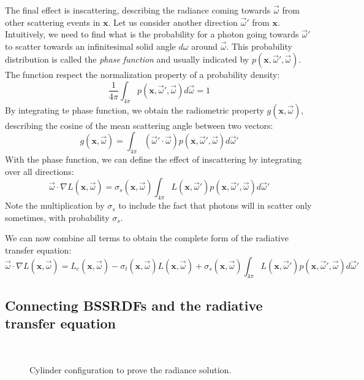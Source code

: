 The final effect is inscattering, describing the radiance coming towards $\vec{\omega}$ from other scattering events in $\mathbf{x}$. Let us consider another direction $\vec{\omega}'$ from $\mathbf{x}$. Intuitively, we need to find what is the probability for a photon going towards $\vec{\omega}'$ to scatter towards an infinitesimal solid angle $d{\omega}$ around $\vec{\omega}$. This probability distribution is called the \emph{phase function} and usually indicated by $p(\mathbf{x}, \vec{\omega}', \vec{\omega})$. The function respect the normalization property of a probability density:
$$\frac{1}{4\pi}\int_{4\pi} p(\mathbf{x}, \vec{\omega}', \vec{\omega}) d\vec{\omega} = 1$$
By integrating te phase function, we obtain the radiometric property $g(\mathbf{x}, \vec{\omega})$, describing the cosine of the mean scattering angle between two vectors:
$$g(\mathbf{x}, \vec{\omega}) = \int_{4\pi} (\vec{\omega}' \cdot \vec{\omega}) p(\mathbf{x}, \vec{\omega}', \vec{\omega}) d\vec{\omega}'$$
With the phase function, we can define the effect of inscattering by integrating over all directions:
$$\vec{\omega} \cdot \nabla L(\mathbf{x}, \vec{\omega}) = \sigma_s(\mathbf{x}, \vec{\omega}) \int_{4\pi} L(\mathbf{x}, \vec{\omega}')  p(\mathbf{x}, \vec{\omega}', \vec{\omega}) d \vec{\omega}'$$
Note the multiplication by $\sigma_s$ to include the fact that photons will in scatter only sometimes, with probability $\sigma_s$. 

We can now combine all terms to obtain the complete form of the radiative transfer equation:
$$\vec{\omega} \cdot \nabla L(\mathbf{x}, \vec{\omega}) = L_e(\mathbf{x}, \vec{\omega}) - \sigma_t(\mathbf{x}, \vec{\omega}) L(\mathbf{x}, \vec{\omega}) + \sigma_s(\mathbf{x}, \vec{\omega}) \int_{4\pi} L(\mathbf{x}, \vec{\omega}')  p(\mathbf{x}, \vec{\omega}', \vec{\omega}) d \vec{\omega}'$$

\subsection{Connecting BSSRDFs and the radiative transfer equation}

\begin{figure}
\centering
   \def\svgwidth{0.8\textwidth}
    \\
\caption{Cylinder configuration to prove the radiance solution.} %
\label{fig:cylinder}
\end{figure}

